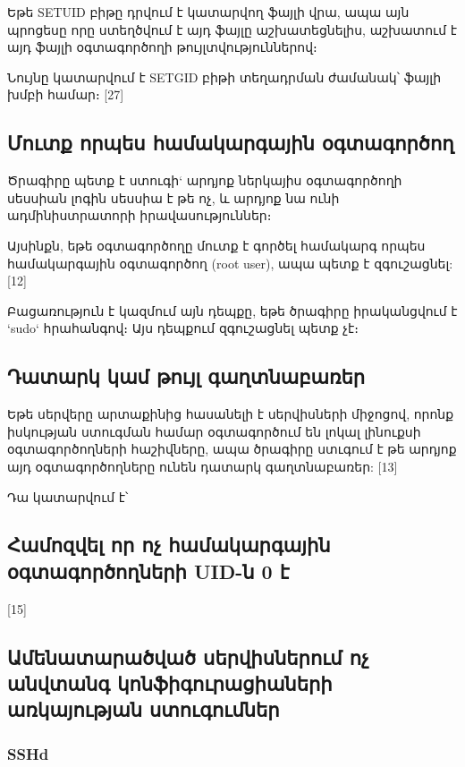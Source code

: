 \documentclass[12pt]{article}
\begin{document}
\begin{sloppypar}
Եթե SETUID բիթը դրվում է կատարվող ֆայլի վրա, ապա
այն պրոցեսը որը ստեղծվում է այդ ֆայլը աշխատեցնելիս,
աշխատում է այդ ֆայլի օգտագործողի թույլտվություններով։

Նույնը կատարվում է SETGID բիթի տեղադրման ժամանակ՝
ֆայլի խմբի համար։
[27]


\subsection{Մուտք որպես համակարգային օգտագործող}

Ծրագիրը պետք է ստուգի` արդյոք ներկայիս օգտագործողի սեսսիան
լոգին սեսսիա է թե ոչ, և արդյոք նա ունի ադմինիստրատորի
իրավասություններ։

Այսինքն, եթե օգտագործողը մուտք է գործել համակարգ որպես
համակարգային օգտագործող (root user), ապա պետք է զգուշացնել: [12]

Բացառություն է կազմում այն դեպքը, եթե ծրագիրը իրականցվում է
`sudo` հրահանգով։ Այս դեպքում զգուշացնել պետք չէ։



\subsection{Դատարկ կամ թույլ գաղտնաբառեր}

Եթե սերվերը արտաքինից հասանելի է սերվիսների միջոցով,
որոնք իսկության ստուգման համար օգտագործում են լոկալ
լինուքսի օգտագործողների հաշիվները, ապա ծրագիրը ստւգում է
թե արդյոք այդ օգտագործողները ունեն դատարկ գաղտնաբառեր: [13]

Դա կատարվում է՝



\subsection{Համոզվել որ ոչ համակարգային օգտագործողների UID-ն 0 է}

[15]


\subsection{Ամենատարածված սերվիսներում ոչ անվտանգ կոնֆիգուրացիաների առկայության ստուգումներ}

\subsubsection{SSHd}


\end{sloppypar}
\end{document}
